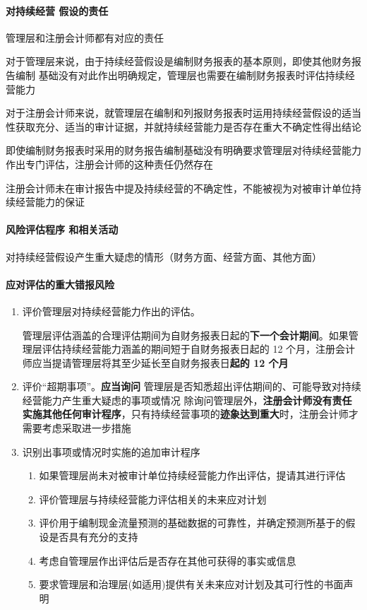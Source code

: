 \documentclass[UTF8,12pt]{ctexart}
\numberwithin{equation}{section} %
\numberwithin{figure}{section}
\numberwithin{table}{section}
\begin{document}
	\paragraph{对持续经营 假设的责任}
	管理层和注册会计师都有对应的责任
	
	对于管理层来说，由于持续经营假设是编制财务报表的基本原则，即使其他财务报告编制 基础没有对此作出明确规定，管理层也需要在编制财务报表时评估持续经营能力
	
	对于注册会计师来说，就管理层在编制和列报财务报表时运用持续经营假设的适当性获取充分、适当的审计证据，并就持续经营能力是否存在重大不确定性得出结论
	
	即使编制财务报表时采用的财务报告编制基础没有明确要求管理层对待续经营能力作出专门评估，注册会计师的这种责任仍然存在
	
	注册会计师未在审计报告中提及持续经营的不确定性，不能被视为对被审计单位持续经营能力的保证
	
	\paragraph{风险评估程序 和相关活动}
	对持续经营假设产生重大疑虑的情形（财务方面、经营方面、其他方面）
	
	\paragraph{应对评估的重大错报风险}
	\begin{enumerate}
		\item 评价管理层对持续经营能力作出的评估。
		
		管理层评估涵盖的合理评估期间为自财务报表日起的\textbf{下一个会计期间}。如果管理层评估持续经营能力涵盖的期间短于自财务报表日起的 12 个月，注册会计师应当提请管理层将其至少延长至自财务报表日\textbf{起的 12 个月}
		
		\item 评价“超期事项”。\textbf{应当询问} 管理层是否知悉超出评估期间的、可能导致对持续经营能力产生重大疑虑的事项或情况 除询问管理层外，\textbf{注册会计师没有责任实施其他任何审计程序}，只有持续经营事项的\textbf{迹象达到重大}时，注册会计师才需要考虑采取进一步措施
		
		\item 识别出事项或情况时实施的追加审计程序
		\begin{enumerate}
			\item 如果管理层尚未对被审计单位持续经营能力作出评估，提请其进行评估
			
			\item 评价管理层与持续经营能力评估相关的未来应对计划
			
			\item 评价用于编制现金流量预测的基础数据的可靠性，并确定预测所基于的假设是否具有充分的支持
			
			\item 考虑自管理层作出评估后是否存在其他可获得的事实或信息
			
			\item 要求管理层和治理层(如适用)提供有关未来应对计划及其可行性的书面声明
		\end{enumerate}
	\end{enumerate}
	
\end{document}
